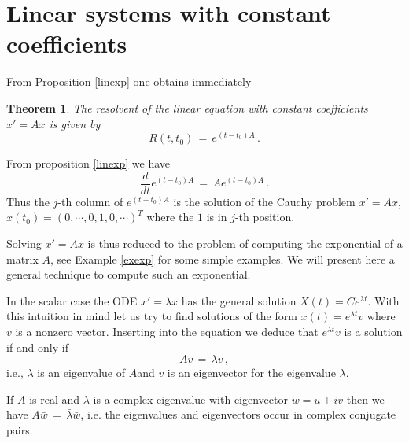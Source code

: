 \documentclass[12pt]{report}
\newtheorem{theorem}{Theorem}[section]
\newcommand{\proof}{\noindent {\em Proof:~}}
\def\qed{\hbox{\hskip 6pt\vrule width6pt height7pt depth1pt
    \hskip1pt}\bigskip}
\begin{document}

\section{Linear systems with constant coefficients} \label{syscoco}

From Proposition \ref{linexp} one obtains immediately 

\begin{theorem} The resolvent of the linear equation with constant 
coefficients 
$x'=Ax$ is given by 
\begin{equation}
R(t,t_0) \,=\, e^{(t-t_0)A} \,.
\end{equation}
\end{theorem}

\proof From proposition \ref{linexp} we have
\begin{equation}
\frac{d}{dt} e^{(t-t_0)A} \,=\, A e^{(t-t_0)A} \,.
\end{equation}
Thus the $j$-th column of $e^{(t-t_0)A}$ is the solution of the Cauchy
problem $x'= Ax$, $x(t_0)=(0, \cdots, 0,1,0, \cdots)^T$ where the $1$
is in $j$-th position. \hfill \qed


Solving $x'=Ax$ is thus reduced to the problem of computing the
exponential of a matrix $A$, see Example \ref{exexp} for some simple examples. 
We will present here a general technique to compute such an exponential. 


In the scalar case the ODE $x'= \lambda x$  has the general solution $X(t)= Ce^{\lambda t}$.  
With this intuition in mind let us try to find solutions of the form  $x(t) = e^{\lambda t} v$ where 
$v$ is a nonzero vector.  Inserting into the equation we deduce that $e^{\lambda t}v$ is  
a solution if and only if 
\begin{equation}\label{eveq}
Av \,=\, \lambda v \,,
\end{equation}
i.e., $\lambda$ is an eigenvalue of $A$and $v$ is an eigenvector for the eigenvalue 
$\lambda$. 


If $A$ is real and $\lambda$ is a complex eigenvalue with eigenvector $w=u+iv$ then we have 
$A{\bar w} \,=\, {\bar \lambda} {\bar  w}$, i.e. the eigenvalues and eigenvectors occur in complex conjugate pairs.  
\end{document}
